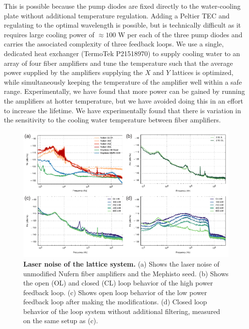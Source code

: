 \documentclass[twocolumn,aps,pra,showpacs,preprintnumbers,bibnotes]{revtex4-1}
\begin{document}
This is possible because the pump diodes are fixed directly to the water-cooling plate without additional temperature regulation.
Adding a Peltier TEC and regulating to the optimal wavelength is possible, but is technically difficult as it requires large cooling power of $\approx100$ W per each of the three pump diodes and carries the associated complexity of three feedback loops.
We use a single, dedicated heat exchanger (TermoTek P21518970) to supply cooling water to an array of four fiber amplifiers and tune the temperature such that the average power supplied by the amplifiers supplying the $X$ and $Y$ lattices is optimized, while simultaneously keeping the temperature of the amplifier well within a safe range.
Experimentally, we have found that more power can be gained by running the amplifiers at hotter temperature, but we have avoided doing this in an effort to increase the lifetime.
We have experimentally found that there is variation in the sensitivity to the cooling water temperature between fiber amplifiers. 

\begin{figure}
  \begin{center}
    \includegraphics{fig/fig3_combined.pdf}
    \caption{\textbf{Laser noise of the lattice system.} (a) Shows the laser noise of unmodified Nufern fiber amplifiers and the Mephisto seed. (b) Shows the open (OL) and closed (CL) loop behavior of the high power feedback loop. (c) Shows open loop behavior of the low power feedback loop after making the modifications. (d) Closed loop behavior of the loop system without additional filtering, measured on the same setup as (c).}\label{fig:noises}
  \end{center}
\end{figure}
\end{document}

